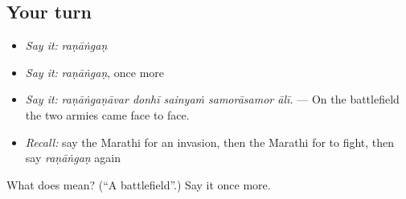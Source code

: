 \subsection*{Your turn}
\begin{itemize}
\raggedright
  \item \emph{Say it:} \emph{raṇāṅgaṇ}
  \item \emph{Say it:} \emph{raṇāṅgaṇ}, once more
  \item \emph{Say it:} \emph{raṇāṅgaṇāvar donhī sainyaṁ samorāsamor ālī.} — On the battlefield the two armies came face to face.
  \item \emph{Recall:} say the Marathi for an invasion, then the Marathi for to fight, then say \emph{raṇāṅgaṇ} again
\end{itemize}

\begin{tcolorbox}[breakable,colback=teal!4,colframe=teal!35!black,title={Before you move on}]
What does  mean? (\textquotedblleft{}A battlefield\textquotedblright{}.) Say it once more.
\end{tcolorbox}
